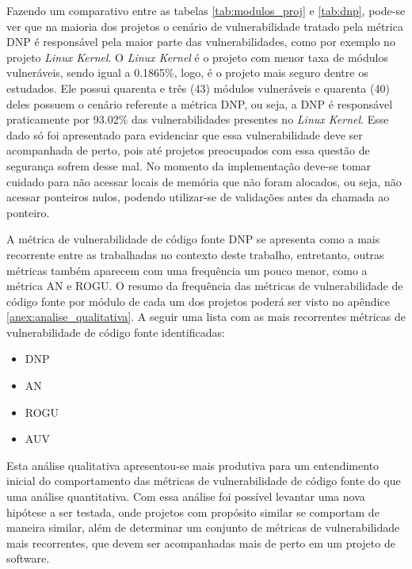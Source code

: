 Fazendo um comparativo entre as tabelas \ref{tab:modulos_proj} e \ref{tab:dnp}, pode-se ver que na
maioria dos projetos o cenário de vulnerabilidade tratado pela métrica DNP é responsável pela maior
parte das vulnerabilidades, como por exemplo no projeto \emph{Linux Kernel}. O \emph{Linux Kernel}
é o projeto com menor taxa de módulos vulneráveis, sendo igual a 0.1865\%, logo, é o projeto mais 
seguro dentre os estudados. Ele possui quarenta e três (43) módulos vulneráveis e quarenta (40) deles
possuem o cenário referente a métrica DNP, ou seja, a DNP é responsável praticamente por 93.02\% das 
vulnerabilidades presentes no \emph{Linux Kernel}. Esse dado só foi apresentado para evidenciar que
essa vulnerabilidade deve ser acompanhada de perto, pois até projetos preocupados com essa questão
de segurança sofrem desse mal. No momento da implementação deve-se tomar cuidado para não acessar 
locais de memória que não foram alocados, ou seja, não acessar ponteiros nulos,
podendo utilizar-se de validações antes da chamada ao ponteiro.

A métrica de vulnerabilidade de código fonte DNP se apresenta como a mais recorrente entre as trabalhadas
no contexto deste trabalho, entretanto, outras métricas também aparecem com uma frequência um pouco menor,
como a métrica AN e ROGU. O resumo da frequência das métricas de vulnerabilidade de código fonte por módulo
de cada um dos projetos poderá ser visto no apêndice \ref{anex:analise_qualitativa}. A seguir uma lista com
as mais recorrentes métricas de vulnerabilidade de código fonte identificadas:

\begin{multicols}{2}
\begin{itemize}
  \item DNP
  \item AN
  \item ROGU
  \item AUV
\end{itemize}
\end{multicols}

Esta análise qualitativa apresentou-se mais produtiva para um entendimento inicial do comportamento
das métricas de vulnerabilidade de código fonte do que uma análise quantitativa. Com essa análise foi
possível levantar uma nova hipótese a ser testada, onde projetos com propósito similar se comportam de 
maneira similar, além de determinar um conjunto de métricas de vulnerabilidade mais recorrentes, que devem
ser acompanhadas mais de perto em um projeto de software.

